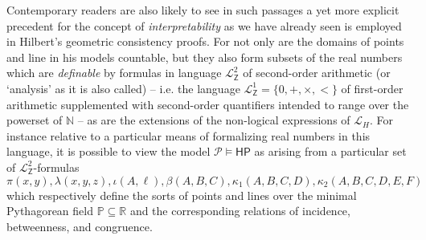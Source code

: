 \documentclass[11pt,fleqn,leqno]{article}
\begin{document}
Contemporary readers are also likely to see in such passages a yet more explicit precedent for the concept of \textsl{interpretability} as we have already seen is employed in Hilbert's geometric consistency proofs.  For not only are the domains of points and line in his models countable, but they also form subsets of the real numbers which are \textsl{definable} by formulas in language $\mathcal{L}^2_{\mathsf{Z}}$ of second-order arithmetic (or `analysis' as it is also called) -- i.e. the language $\mathcal{L}^1_{\mathsf{Z}} = \{0,+,\times,<\}$ of first-order arithmetic supplemented with second-order quantifiers intended to range over the powerset of $\mathbb{N}$ -- as are the extensions of the non-logical expressions of $\mathcal{L}_H$.  For instance relative to a particular means of formalizing real numbers in this language, it is possible to view the model $\mathcal{P} \models \mathsf{HP}$ as arising from a particular set of $\mathcal{L}^2_{\mathsf{Z}}$-formulas $\pi(x,y),\lambda(x,y,z),\iota(A,\ell),\beta(A,B,C),\kappa_1(A,B,C,D),\kappa_2(A,B,C,D,E,F)$ which respectively define the sorts of points and lines over the minimal Pythagorean field $\mathbb{P} \subseteq \mathbb{R}$ and the corresponding relations of incidence, betweenness, and congruence.   
\end{document}
